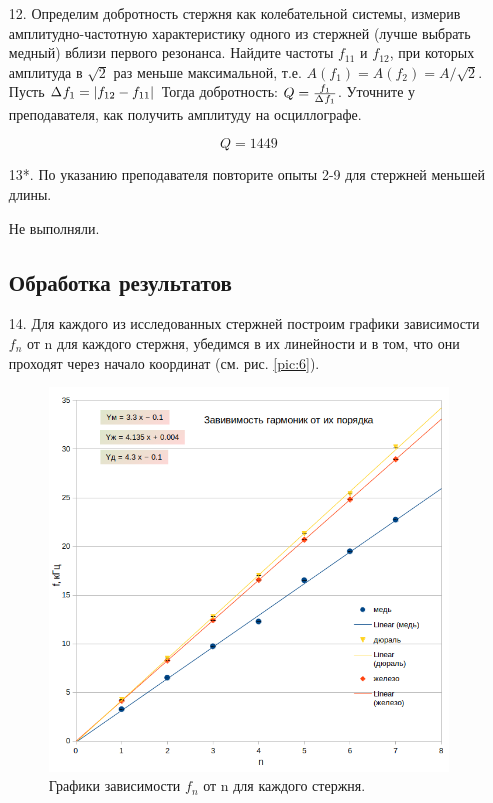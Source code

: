 \documentclass[a4paper,12pt]{article}
\numberwithin{equation}{section}
\begin{document}
\begin{enumerate}
\item[12.] \label{Выполнение:12}
  Определим добротность стержня как колебательной системы, измерив амплитудно-частотную характеристику одного из стержней (лучше выбрать медный) вблизи первого резонанса. Найдите частоты $f_{11}$ и $f_{12}$, при которых амплитуда в $\sqrt{2}$ раз меньше максимальной, т.е. $A(f_1) = A(f_2) = A / \sqrt{2}$. Пусть $\D{f_1} = |f_{12} - f_{11}|$ Тогда добротность: $Q = \frac{f_1}{\D{f_1}}$. Уточните у преподавателя, как получить амплитуду на осциллографе.

\[ Q = 1449 \]

\item[13*.] \label{Выполнение:13}
  По указанию преподавателя повторите опыты 2-9 для стержней меньшей длины.

\begin{center}
  Не выполняли.
\end{center}

\subsection{Обработка результатов}

\item[14.] \label{Выполнение:14}
  Для каждого из исследованных стержней построим графики зависимости $f_n$ от n для каждого стержня, убедимся в их линейности и в том, что они проходят через начало координат (см. рис. \ref{pic:6}).
  
\begin{figure} [H] \center
  \includegraphics[scale=0.7]{data/f(n)}
  \caption{Графики зависимости $f_n$ от n для каждого стержня.}
  \label{pic:7}
\end{figure}


\end{enumerate}
\end{document}
